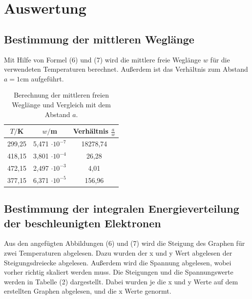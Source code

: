 
\section{Auswertung}
\label{sec:Auswertung}

\subsection{Bestimmung der mittleren Weglänge}
Mit Hilfe von Formel (6) und (7) wird die mittlere freie Weglänge $w$ für die verwendeten Temperaturen berechnet. Außerdem ist das Verhältnis zum Abstand $a = 1 \si{\cm}$ aufgeführt.
\begin{table}[H]
  \centering
  \caption{Berechnung der mittleren freien Weglänge und Vergleich mit dem Abstand $a$.}
  \label{tab:Parameter}
  \begin{tabular}{c c c}
    \toprule
    $T/$K& $w/$m  & Verhältnis $\frac{a}{w}$ \\
    \bottomrule
    299,25 & 5,471 $\cdot 10^{-7}$ & 18278,74 \\
    418,15 & 3,801 $\cdot 10^{-4}$ & 26,28\\
    472,15 & 2,497 $\cdot 10^{-3}$ & 4,01\\
    377,15 & 6,371 $\cdot 10^{-5}$ & 156,96\\
     \bottomrule
  \end{tabular}
\end{table}


\subsection{Bestimmung der integralen Energieverteilung der beschleunigten Elektronen}

Aus den angefügten Abbildungen (6) und (7) wird die Steigung des Graphen für zwei Temperaturen abgelesen. 
Dazu wurden der x und y Wert abgelesen der Steigungsdreiecke abgelesen. Außerdem wird die Spannung abgelesen, wobei vorher richtig skaliert werden muss. Die Steigungen und die Spannungswerte werden in Tabelle (2) dargestellt.
Dabei wurden je die x und y Werte auf dem erstellten Graphen abgelesen, und die x Werte genormt.

